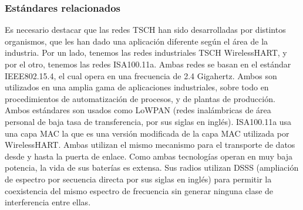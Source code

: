 \subsubsection{Estándares relacionados}

Es necesario destacar que las redes TSCH han sido desarrolladas por distintos organismos, que les han dado una aplicación diferente según el área de la industria. Por un lado, tenemos las redes industriales TSCH WirelessHART, y por el otro, tenemos las redes ISA100.11a. Ambas redes se basan en el estándar IEEE802.15.4, el cual opera en una frecuencia de 2.4 Gigahertz. Ambos son utilizados en una amplia gama de aplicaciones industriales, sobre todo en procedimientos de automatización de procesos, y de plantas de producción.
Ambos estándares son usados como LoWPAN (redes inalámbricas de área personal de baja tasa de transferencia, por sus siglas en inglés). ISA100.11a usa una capa MAC la que es una versión modificada de la capa MAC utilizada por WirelessHART. Ambas utilizan el mismo mecanismo para el transporte de datos desde y hasta la puerta de enlace. Como ambas tecnologías operan en muy baja potencia, la vida de sus baterías es extensa.
Sus radios utilizan DSSS (ampliación de espectro por secuencia directa por sus siglas en inglés) para permitir la coexistencia del mismo espectro de frecuencia sin generar ninguna clase de interferencia entre ellas.

